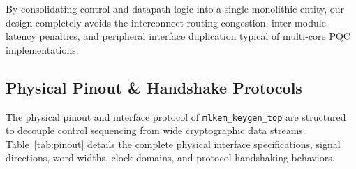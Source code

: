 By consolidating control and datapath logic into a single monolithic entity, our design completely avoids the interconnect routing congestion, inter-module latency penalties, and peripheral interface duplication typical of multi-core PQC implementations.

\subsection{Physical Pinout \& Handshake Protocols}
\label{sec:arch_pinout}

The physical pinout and interface protocol of \texttt{mlkem\_keygen\_top} are structured to decouple control sequencing from wide cryptographic data streams. Table~\ref{tab:pinout} details the complete physical interface specifications, signal directions, word widths, clock domains, and protocol handshaking behaviors.

